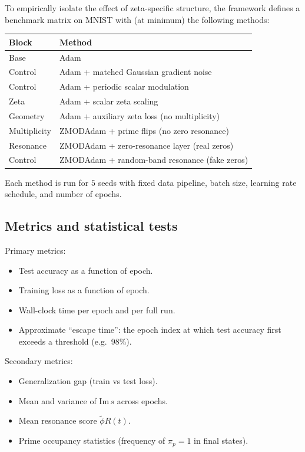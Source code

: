 \documentclass[11pt]{article}
\begin{document}
To empirically isolate the effect of zeta-specific structure, the framework defines a benchmark matrix on MNIST with (at minimum) the following methods:

\begin{center}
\begin{tabular}{ll}
\toprule
Block & Method \\
\midrule
Base & Adam \\
Control & Adam + matched Gaussian gradient noise \\
Control & Adam + periodic scalar modulation \\
Zeta & Adam + scalar zeta scaling \\
Geometry & Adam + auxiliary zeta loss (no multiplicity) \\
Multiplicity & ZMODAdam + prime flips (no zero resonance) \\
Resonance & ZMODAdam + zero-resonance layer (real zeros) \\
Control & ZMODAdam + random-band resonance (fake zeros) \\
\bottomrule
\end{tabular}
\end{center}

Each method is run for $5$ seeds with fixed data pipeline, batch size, learning rate schedule, and number of epochs.

\subsection{Metrics and statistical tests}

Primary metrics:
\begin{itemize}[leftmargin=*]
  \item Test accuracy as a function of epoch.
  \item Training loss as a function of epoch.
  \item Wall-clock time per epoch and per full run.
  \item Approximate ``escape time'': the epoch index at which test accuracy first exceeds a threshold (e.g.\ 98\%).
\end{itemize}

Secondary metrics:
\begin{itemize}[leftmargin=*]
  \item Generalization gap (train vs test loss).
  \item Mean and variance of $\mathrm{Im}\,s$ across epochs.
  \item Mean resonance score $\tilde{\phi} R(t)$.
  \item Prime occupancy statistics (frequency of $\pi_p = 1$ in final states).
\end{itemize}
\end{document}
